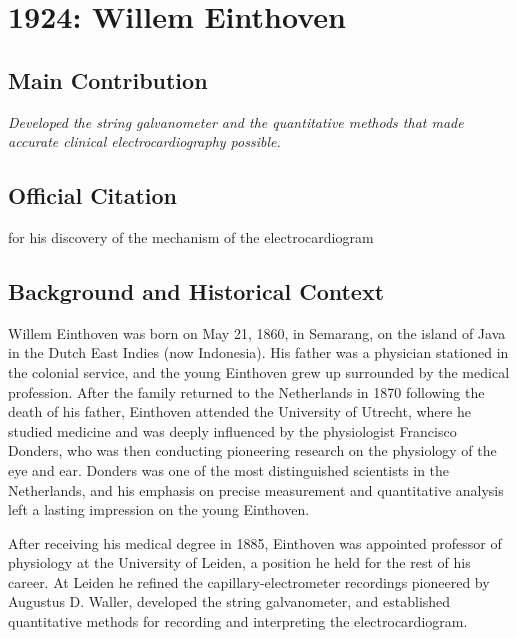 \chapter[1924 --- Einthoven]{1924: Willem Einthoven}
\label{ch:1924_willemeinthoven}

\section*{Main Contribution}

\textit{Developed the string galvanometer and the quantitative methods that made accurate clinical electrocardiography possible.}\cite{nobel-1924,lecture-1924}

\section{Official Citation}

for his discovery of the mechanism of the electrocardiogram

\section{Background and Historical Context}

Willem Einthoven was born on May 21, 1860, in Semarang, on the island of Java in the Dutch East Indies (now Indonesia). His father was a physician stationed in the colonial service, and the young Einthoven grew up surrounded by the medical profession. After the family returned to the Netherlands in 1870 following the death of his father, Einthoven attended the University of Utrecht, where he studied medicine and was deeply influenced by the physiologist Francisco Donders, who was then conducting pioneering research on the physiology of the eye and ear. Donders was one of the most distinguished scientists in the Netherlands, and his emphasis on precise measurement and quantitative analysis left a lasting impression on the young Einthoven.

After receiving his medical degree in 1885, Einthoven was appointed professor of physiology at the University of Leiden, a position he held for the rest of his career. At Leiden he refined the capillary-electrometer recordings pioneered by Augustus D. Waller, developed the string galvanometer, and established quantitative methods for recording and interpreting the electrocardiogram.\cite{einthoven-biographical}

